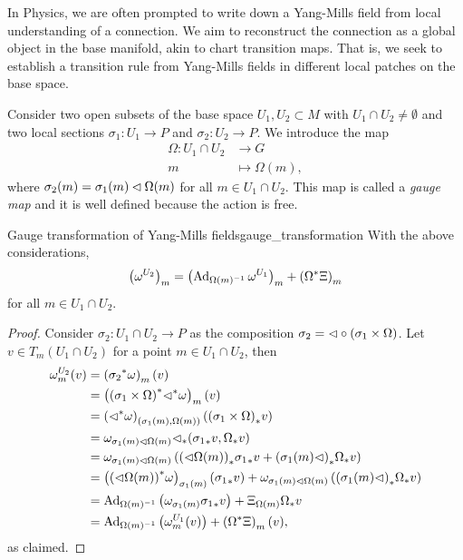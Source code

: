 In Physics, we are often prompted to write down a Yang-Mills field from local understanding of a connection. We aim to reconstruct the connection as a global object in the base manifold, akin to chart transition maps. That is, we seek to establish a transition rule from Yang-Mills fields in different local patches on the base space.

Consider two open subsets of the base space \(U_1, U_2 \subset M\) with \(U_1 \cap U_2 \neq \emptyset\) and two local sections \(\sigma_{1} : U_1 \to P\) and \(\sigma_{2} : U_2 \to P\). We introduce the map
\begin{align*}
    \Omega : U_1 \cap U_2 &\to G\\
                        m &\mapsto \Omega(m),
\end{align*}
where \(\sigma_2(m) = \sigma_1(m) \mathbin{\vartriangleleft} \Omega(m)\) for all \(m \in U_1 \cap U_2.\) This map is called a \emph{gauge map} and it is well defined because the action is free.

\begin{theorem}{Gauge transformation of Yang-Mills fields}{gauge_transformation}
    With the above considerations,
    \begin{equation*}
        \left(\omega^{U_2}\right)_m = \left(\operatorname{Ad}_{\Omega(m)^{-1}}\omega^{U_1}\right)_m + \left({\Omega}^{\ast}_{}{\Xi}\right)_m
    \end{equation*}
    for all \(m\in U_1 \cap U_2\).
\end{theorem}
\begin{proof}
    Consider \(\sigma_2 : U_1 \cap U_2 \to P\) as the composition \(\sigma_2 = \mathbin{\vartriangleleft} \circ (\sigma_1 \times \Omega)\). Let \(v \in T_m(U_1 \cap U_2)\) for a point \(m \in U_1 \cap U_2\), then
    \begin{align*}
        \omega^{U_2}_m(v) &= \left({\sigma_2}^{\ast}_{}{\omega}\right)_m(v)\\
                          &= \left({(\sigma_1 \times \Omega)}^{\ast}_{}{{\mathbin{\vartriangleleft}}^{\ast}_{}{\omega}}\right)_m(v)\\
                          &= \left({\mathbin{\vartriangleleft}}^{\ast}_{}{\omega}\right)_{(\sigma_1(m), \Omega(m))} \left({(\sigma_1\times \Omega)}_{\ast{}}{v}\right)\\
                          &= \omega_{\sigma_1(m) \mathbin{\vartriangleleft} \Omega(m)}{\mathbin{\vartriangleleft}}_{\ast{}}{({\sigma_1}_{\ast{}}{v}, {\Omega}_{\ast{}}{v})}\\
                          &= \omega_{\sigma_1(m) \mathbin{\vartriangleleft} \Omega(m)}\left({(\mathbin{\vartriangleleft}\Omega(m))}_{\ast{}}{{\sigma_1}_{\ast{}}{v}} + {(\sigma_1(m)\mathbin{\vartriangleleft})}_{\ast{}}{{\Omega}_{\ast{}}{v}}\right)\\
                          &= \left({(\mathbin{\vartriangleleft} \Omega(m))}^{\ast}_{}{\omega}\right)_{\sigma_1(m)}({\sigma_1}_{\ast{}}{v}) + \omega_{\sigma_1(m)\mathbin{\vartriangleleft} \Omega(m)}\left({(\sigma_1(m) \mathbin{\vartriangleleft})}_{\ast{}}{{\Omega}_{\ast{}}{v}}\right)\\
                          &= \operatorname{Ad}_{\Omega(m)^{-1}}\left(\omega_{\sigma_1(m)}{\sigma_1}_{\ast{}}{v}\right)+ \Xi_{\Omega(m)}{\Omega}_{\ast{}}{v}\\
                          &= \operatorname{Ad}_{\Omega(m)^{-1}}\left(\omega^{U_1}_m(v)\right) + \left({\Omega}^{\ast}_{}\Xi\right)_m(v),
    \end{align*}
    as claimed.
\end{proof}

